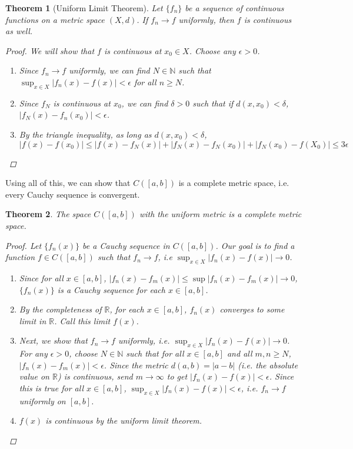 \documentclass[12pt]{amsart}         %
\newtheorem{theorem}{Theorem}[section]
\theoremstyle{remark}
\newcommand{\N}{\mathbb{N}}
\newcommand{\R}{\mathbb{R}}
\begin{document}
\begin{theorem}[Uniform Limit Theorem]
Let $\{f_n\}$ be a sequence of continuous functions on a metric space $(X,d)$.
If $f_n \rightarrow f$ uniformly, then $f$ is continuous as well.
\begin{proof}
We will show that $f$ is continuous at $x_0 \in X$. Choose any $\epsilon > 0$.
\begin{enumerate}
\item Since $f_n \rightarrow f$ uniformly, we can find $N \in \N$ such that $\sup_{x \in X}|f_n(x) - f(x)| < \epsilon$ for all $n \geq N$.
\item Since $f_N$ is continuous at $x_0$, we can find $\delta > 0$ such that if $d(x, x_0) < \delta$, $|f_N(x) - f_n(x_0)| < \epsilon$. 
\item By the triangle inequality, as long as $d(x, x_0) < \delta$,
\[
|f(x) - f(x_0)| \leq |f(x) - f_N(x)| + |f_N(x) - f_N(x_0)| + |f_N(x_0) - f(X_0)| \leq 3 \epsilon
\]
\end{enumerate}
\end{proof}
\end{theorem}

Using all of this, we can show that $C([a,b])$ is a complete metric space, i.e. every Cauchy sequence is convergent.

\begin{theorem}
The space $C([a,b])$ with the uniform metric is a complete metric space.
\begin{proof}
Let $\{ f_n(x) \}$ be a Cauchy sequence in $C([a,b])$. Our goal is to find a function $f \in C([a,b])$ such that $f_n \rightarrow f$, i.e $\sup_{x \in X}|f_n(x) - f(x)| \rightarrow 0$.
\begin{enumerate}
    \item Since for all $x \in [a,b]$, $| f_n(x) - f_m(x)| \leq \sup| f_n(x) - f_m(x)| \rightarrow 0$, $\{ f_n(x) \}$ is a Cauchy sequence for each $x \in [a,b]$.
    \item By the completeness of $\R$, for each $x \in [a,b]$, $f_n(x)$ converges to some limit in $\R$. Call this limit $f(x)$.
    \item Next, we show that $f_n \rightarrow f$ uniformly, i.e. $\sup_{x \in X}| f_n(x) - f(x)| \rightarrow 0$. For any $\epsilon > 0$, choose $N \in \N$ such that for all $x \in [a, b]$ and all $m, n \geq N$, $|f_n(x) - f_m(x)| < \epsilon$. Since the metric $d(a,b) = |a - b|$ (i.e. the absolute value on $\R$) is continuous, send $m \rightarrow \infty$ to get $|f_n(x) - f(x)| < \epsilon$. Since this is true for all $x \in [a,b]$, $\sup_{x \in X}|f_n(x) - f(x)| < \epsilon$, i.e. $f_n \rightarrow f$ uniformly on $[a,b]$.
    \item $f(x)$ is continuous by the uniform limit theorem.
\end{enumerate}
\end{proof}
\end{theorem}
\end{document}

